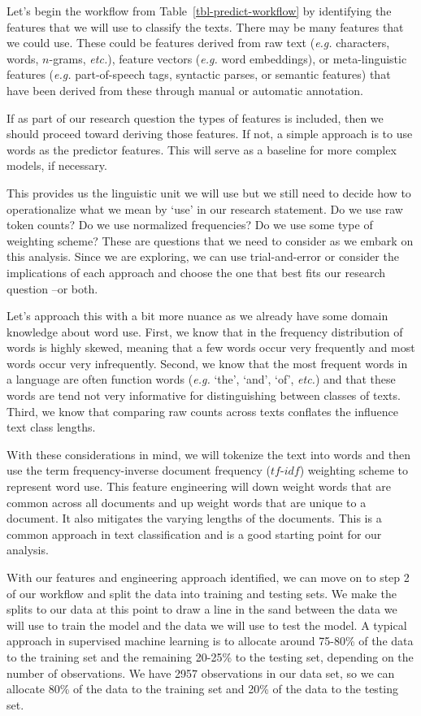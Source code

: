 \documentclass[
  letterpaper,
]{latex/krantz}
\theoremstyle{definition}
\theoremstyle{remark}
\begin{document}
Let's begin the workflow from Table~\ref{tbl-predict-workflow} by
identifying the features that we will use to classify the texts. There
may be many features that we could use. These could be features derived
from raw text (\emph{e.g.} characters, words, \(n\)-grams, \emph{etc.}),
feature vectors (\emph{e.g.} word embeddings), or meta-linguistic
features (\emph{e.g.} part-of-speech tags, syntactic parses, or semantic
features) that have been derived from these through manual or automatic
annotation.

If as part of our research question the types of features is included,
then we should proceed toward deriving those features. If not, a simple
approach is to use words as the predictor features. This will serve as a
baseline for more complex models, if necessary.

This provides us the linguistic unit we will use but we still need to
decide how to operationalize what we mean by `use' in our research
statement. Do we use raw token counts? Do we use normalized frequencies?
Do we use some type of weighting scheme? These are questions that we
need to consider as we embark on this analysis. Since we are exploring,
we can use trial-and-error or consider the implications of each approach
and choose the one that best fits our research question --or both.

Let's approach this with a bit more nuance as we already have some
domain knowledge about word use. First, we know that in the frequency
distribution of words is highly skewed, meaning that a few words occur
very frequently and most words occur very infrequently. Second, we know
that the most frequent words in a language are often function words
(\emph{e.g.} `the', `and', `of', \emph{etc.}) and that these words are
tend not very informative for distinguishing between classes of texts.
Third, we know that comparing raw counts across texts conflates the
influence text class lengths.

With these considerations in mind, we will tokenize the text into words
and then use the term frequency-inverse document frequency
(\(tf\)-\(idf\)) weighting scheme to represent word use. This feature
engineering will down weight words that are common across all documents
and up weight words that are unique to a document. It also mitigates the
varying lengths of the documents. This is a common approach in text
classification and is a good starting point for our analysis.

With our features and engineering approach identified, we can move on to
step 2 of our workflow and split the data into training and testing
sets. We make the splits to our data at this point to draw a line in the
sand between the data we will use to train the model and the data we
will use to test the model. A typical approach in supervised machine
learning is to allocate around 75-80\% of the data to the training set
and the remaining 20-25\% to the testing set, depending on the number of
observations. We have 2957 observations in our data set, so we can
allocate 80\% of the data to the training set and 20\% of the data to
the testing set.
\end{document}

